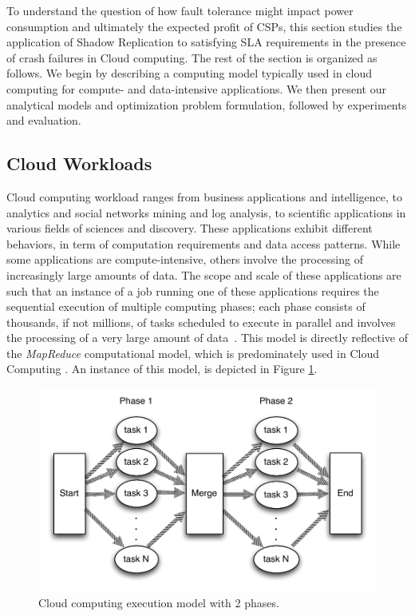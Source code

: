 To understand the question of how
fault tolerance might impact power consumption and ultimately the expected profit of CSPs, this section studies the application of Shadow Replication to satisfying SLA requirements in the presence of crash failures in Cloud computing. The rest of the section is organized as follows. We begin by describing a computing model typically used in cloud computing for compute- and data-intensive applications. We then present our analytical models and optimization problem formulation, followed by experiments and evaluation. 


\subsection{Cloud Workloads}
Cloud computing workload ranges from business applications and
intelligence, to analytics and social networks mining and log
analysis, to scientific applications in various fields of sciences and
discovery. These applications exhibit different behaviors, in term of
computation requirements and data access patterns. While some
applications are compute-intensive, others involve the processing of
increasingly large amounts of data. The scope and scale of these
applications are such that an instance of a job running one of these
applications requires the sequential execution of multiple computing
phases; each phase consists of thousands, if not millions, of tasks
scheduled to execute in parallel and involves the processing of a very
large amount of data~\cite{lin2010data,Ferdman:2012:CCS:2150976.2150982}. This
model is directly reflective of the \emph{MapReduce} computational
model, which is predominately used in
Cloud Computing \cite{mrbs}.  An instance of this model, is depicted in Figure \ref{fig:map_reduce}.


\begin{figure}[!h]
	\begin{center}
		\includegraphics[width=\columnwidth]{Figures/map_reduce.pdf}
	\end{center}
	\caption{Cloud computing execution model with 2 phases.}
	\label{fig:map_reduce}
\end{figure}

